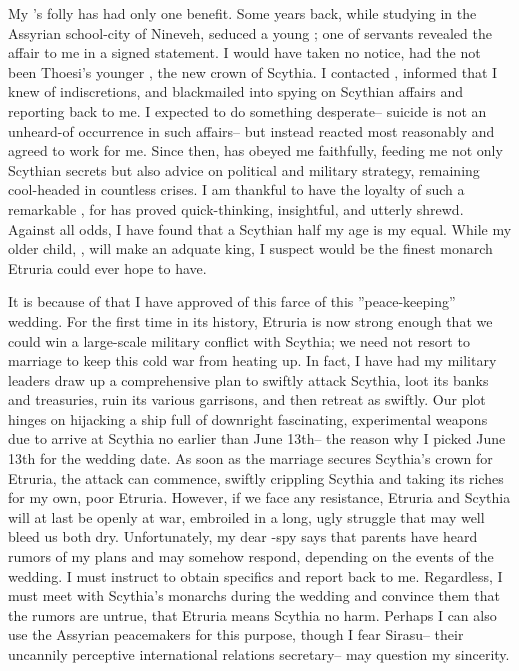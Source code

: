 \documentclass[char]{Kos}
\begin{document}
My \cPoet{\offspring}'s folly has had only one benefit. Some years back, while studying in the Assyrian school-city of Nineveh, \cPoet{\they} seduced a young \cBride{\human}; one of \cPoet{\their} servants revealed the affair to me in a signed statement. I would have taken no notice, had the \cBride{\they} not been Thoesi's younger \cBride{\sibling}, the new crown \cBride{\prince} of Scythia. I contacted \cBride{\them}, informed \cBride{\them} that I knew of \cBride{\their} indiscretions, and blackmailed \cBride{\them} into spying on Scythian affairs and reporting back to me. I expected \cBride{\them} to do something desperate-- suicide is not an unheard-of occurrence in such affairs-- but \cBride{\they} instead reacted most reasonably and agreed to work for me. Since then, \cBride{\they} has obeyed me faithfully, feeding me not only Scythian secrets but also advice on political and military strategy, remaining cool-headed in countless crises. I am thankful to have the loyalty of such a remarkable \cBride{\human}, for \cBride{\they} has proved \cBride{\themself} quick-thinking, insightful, and utterly shrewd. Against all odds, I have found that a Scythian \cBride{\prince} half my age is my equal. While my older child, \cGroom{}, will make an adquate king, I suspect \cBride{\they} would be the finest monarch Etruria could ever hope to have.

It is because of \cBride{\them} that I have approved of this farce of this ''peace-keeping'' wedding. For the first time in its history, Etruria is now strong enough that we could win a large-scale military conflict with Scythia; we need not resort to marriage to keep this cold war from heating up. In fact, I have had my military leaders draw up a comprehensive plan to swiftly attack Scythia, loot its banks and treasuries, ruin its various garrisons, and then retreat as swiftly. Our plot hinges on hijacking a ship full of downright fascinating, experimental weapons due to arrive at Scythia no earlier than June 13th-- the reason why I picked June 13th for the wedding date. As soon as the marriage secures Scythia's crown \cBride{\prince} for Etruria, the attack can commence, swiftly crippling Scythia and taking its riches for my own, poor Etruria. However, if we face any resistance, Etruria and Scythia will at last be openly at war, embroiled in a long, ugly struggle that may well bleed us both dry. Unfortunately, my dear \cBride{\prince}-spy says that \cBride{\their} parents have heard rumors of my plans and may somehow respond, depending on the events of the wedding. I must instruct \cBride{\them} to obtain specifics and report back to me. Regardless, I must meet with Scythia's monarchs during the wedding and convince them that the rumors are untrue, that Etruria means Scythia no harm. Perhaps I can also use the Assyrian peacemakers for this purpose, though I fear Sirasu-- their uncannily perceptive international relations secretary-- may question my sincerity.
\end{document}
